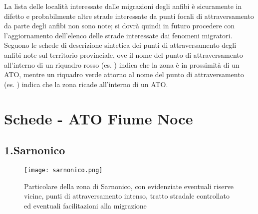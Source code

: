 \documentclass[11pt,a4paper,twoside]{memoir}
\begin{document}
La lista delle località interessate dalle migrazioni degli anfibi è sicuramente in difetto e probabilmente altre strade interessate da punti focali di attraversamento da parte degli anfibi non sono note; si dovrà quindi  in futuro procedere con l'aggiornamento dell’elenco delle strade interessate dai fenomeni migratori.
Seguono le schede di descrizione sintetica dei punti di attraversamento degli anfibi note sul territorio provinciale, ove il nome del punto di attraversamento all'interno di un riquadro rosso (es. ) indica che la zona è in prossimità di un ATO, mentre un riquadro verde attorno al nome del punto di attraversamento (es. ) indica che la zona ricade all'interno di un ATO.



\newpage
\section{Schede - ATO Fiume Noce}

\begin{tcolorbox}[breakable,colback=white,colframe=red,width=10cm]
\subsection{1.Sarnonico}
\end{tcolorbox}

\begin{figure}[H]
\label{fig:map_sarnonico}
\centering
  \texttt{[image: sarnonico.png]}
\caption{Particolare della zona di Sarnonico, con evidenziate eventuali riserve vicine, punti di attraversamento intenso, tratto stradale controllato ed eventuali facilitazioni alla migrazione}
\end{figure}
\end{document}
